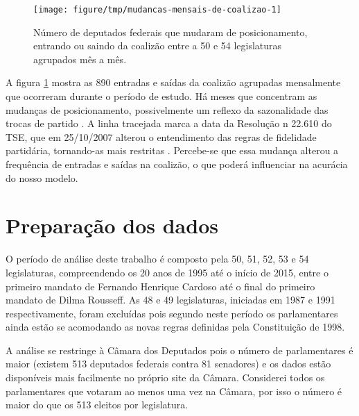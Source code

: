 \documentclass[a4paper,titlepage]{ppgi}\usepackage[]{graphicx}\usepackage[]{color}
\newenvironment{knitrout}{}{} %
\begin{document}
\begin{knitrout}
\color{fgcolor}\begin{figure}
\texttt{[image: figure/tmp/mudancas-mensais-de-coalizao-1]} \caption[Número de deputados federais que mudaram de posicionamento, entrando ou saindo da coalizão entre a 50\textordfeminine{} e 54\textordfeminine{} legislaturas agrupados mês a mês]{Número de deputados federais que mudaram de posicionamento, entrando ou saindo da coalizão entre a 50\textordfeminine{} e 54\textordfeminine{} legislaturas agrupados mês a mês.}\label{fig:mudancas-mensais-de-coalizao}
\end{figure}


\end{knitrout}

A figura \ref{fig:mudancas-mensais-de-coalizao} mostra as
890 entradas e saídas da coalizão agrupadas
mensalmente que ocorreram durante o período de estudo. Há meses que concentram
as mudanças de posicionamento, possivelmente um reflexo da sazonalidade das
trocas de partido \cite{Araujo2000,Melo2004,Freitas2008}. A linha tracejada
marca a data da Resolução n\textordmasculine{} 22.610 do TSE, que em
25/10/2007 alterou o entendimento das
regras de fidelidade partidária, tornando-as mais restritas \cite{TSE2007}.
Percebe-se que essa mudança alterou a frequência de entradas e saídas na
coalizão, o que poderá influenciar na acurácia do nosso modelo.

\section{Preparação dos dados}


O período de análise deste trabalho é composto pela 50\textordfeminine{},
51\textordfeminine{}, 52\textordfeminine{}, 53\textordfeminine{} e
54\textordfeminine{} legislaturas, compreendendo os 20 anos de 1995 até o
início de 2015, entre o primeiro mandato de Fernando Henrique Cardoso até o
final do primeiro mandato de Dilma Rousseff. As 48\textordfeminine{} e
49\textordfeminine{} legislaturas, iniciadas em 1987 e 1991 respectivamente,
foram excluídas pois segundo  neste período os
parlamentares ainda estão se acomodando as novas regras definidas pela
Constituição de 1998.


A análise se restringe à Câmara dos Deputados pois o número de parlamentares é
maior (existem 513 deputados federais contra 81 senadores) e os dados estão
disponíveis mais facilmente no próprio site da Câmara. Considerei todos os
parlamentares que votaram ao menos uma vez na Câmara, por isso o número é maior
do que os 513 eleitos por legislatura.
\end{document}
